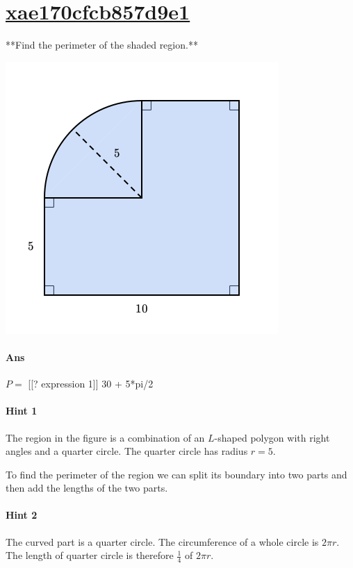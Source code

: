 \documentclass[twocolumn,10pt]{article}
\def\shrinkfactor{0.45}
\begin{document}
\section{\href{https://www.khanacademy.org/devadmin/content/items/xae170cfcb857d9e1}{xae170cfcb857d9e1}}

\noindent
**Find the perimeter of the shaded region.**


\includegraphics[scale=\shrinkfactor]{figures/b0216381822fdf828c9b1c0c60a3da3a18cdb9da.png}

\paragraph{Ans} $P =$ 
[[? expression 1]]  30 + 5*pi/2

\paragraph{Hint 1}The region in the figure is a combination of an $L$-shaped polygon with right angles and a quarter circle.  The quarter circle has radius $r=5$.

To find the perimeter of the region we can split its boundary into two parts and then add the lengths of the two parts.

\paragraph{Hint 2}The curved part is a quarter circle. The circumference of a whole circle is $2\pi r$. The length of quarter circle is therefore $\frac{1}{4}$ of $2\pi r$.
\end{document}
